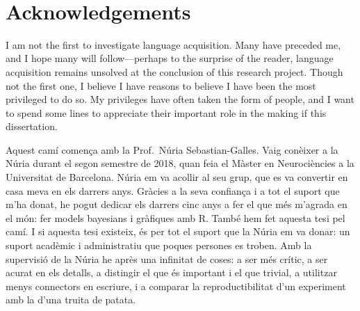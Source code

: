 \documentclass[
  12pt,
  b5paperpaper,
  twoside]{scrreprt}
\begin{document}
\begin{spacing}{1.5}


\clearpage
 \begin{flushleft}%
  \thispagestyle{empty}
  \normalsize\itshape{}
\end{flushleft}
\clearpage


\clearpage
~
\thispagestyle{empty}
\clearpage


\clearpage
\chapter*{\sffamily Acknowledgements}
\vspace*{\baselineskip}
\normalsize{I am not the first to investigate language acquisition. Many
have preceded me, and I hope many will follow---perhaps to the surprise
of the reader, language acquisition remains unsolved at the conclusion
of this research project. Though not the first one, I believe I have
reasons to believe I have been the most privileged to do so. My
privileges have often taken the form of people, and I want to spend some
lines to appreciate their important role in the making if this
dissertation.

Aquest camí comença amb la Prof.~Núria Sebastian-Galles. Vaig conèixer a
la Núria durant el segon semestre de 2018, quan feia el Màster en
Neurociències a la Universitat de Barcelona. Núria em va acollir al seu
grup, que es va convertir en casa meva en els darrers anys. Gràcies a la
seva confiança i a tot el suport que m'ha donat, he pogut dedicar els
darrers cinc anys a fer el que més m'agrada en el món: fer models
bayesians i gràfiques amb R. També hem fet aquesta tesi pel camí. I si
aquesta tesi existeix, és per tot el suport que la Núria em va donar: un
suport acadèmic i administratiu que poques persones es troben. Amb la
supervisió de la Núria he après una infinitat de coses: a ser més
crític, a ser acurat en els detalls, a distingir el que és important i
el que trivial, a utilitzar menys connectors en escriure, i a comparar
la reproductibilitat d'un experiment amb la d'una truita de patata.

}
\end{spacing}
\end{document}

